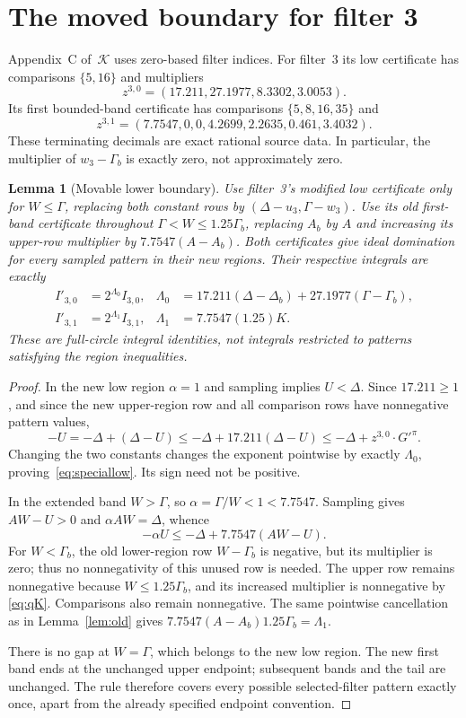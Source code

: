 \documentclass[11pt]{article}
\newtheorem{lemma}[theorem]{Lemma}
\theoremstyle{remark}\newtheorem*{remark}{Scope}
\begin{document}
\section{The moved boundary for filter 3}\label{sec:new}
Appendix~C of~$\mathcal K$ uses zero-based filter indices. For filter~3
its low certificate has comparisons $\{5,16\}$ and multipliers
\[
 z^{3,0}=(17.211,27.1977,8.3302,3.0053).
\]
Its first bounded-band certificate has comparisons $\{5,8,16,35\}$ and
\[
 z^{3,1}=(7.7547,0,0,4.2699,2.2635,0.461,3.4032).
\]
These terminating decimals are exact rational source data. In particular,
the multiplier of $w_3-\Gamma_b$ is exactly zero, not approximately zero.

\begin{lemma}[Movable lower boundary]\label{lem:new}
Use filter~3's modified low certificate only for $W\le\Gamma$,
replacing both constant rows by $(\Delta-u_3,\Gamma-w_3)$.
Use its old first-band certificate throughout
$\Gamma<W\le1.25\Gamma_b$, replacing $A_b$ by $A$ and increasing
its upper-row multiplier by $7.7547(A-A_b)$.
Both certificates give ideal domination for every sampled pattern in
their new regions. Their respective integrals are exactly
\begin{align}
 I'_{3,0}&=2^{\Lambda_0}I_{3,0},&
 \Lambda_0&=17.211(\Delta-\Delta_b)+27.1977(\Gamma-\Gamma_b),\label{eq:speciallow}\\
 I'_{3,1}&=2^{\Lambda_1}I_{3,1},&
 \Lambda_1&=7.7547(1.25)K.\label{eq:specialband}
\end{align}
These are full-circle integral identities, not integrals restricted to
patterns satisfying the region inequalities.
\end{lemma}
\begin{proof}
In the new low region $\alpha=1$ and sampling implies $U<\Delta$.
Since $17.211\ge1$, and since the new upper-region row and all
comparison rows have nonnegative pattern values,
\[
 -U=-\Delta+(\Delta-U)
 \le-\Delta+17.211(\Delta-U)\le-\Delta+z^{3,0}\cdot G'^\pi.
\]
Changing the two constants changes the exponent pointwise by exactly
$\Lambda_0$, proving~\eqref{eq:speciallow}. Its sign need not be positive.

In the extended band $W>\Gamma$, so $\alpha=\Gamma/W<1<7.7547$.
Sampling gives $AW-U>0$ and $\alpha AW=\Delta$, whence
\[
 -\alpha U\le-\Delta+7.7547(AW-U).
\]
For $W<\Gamma_b$, the old lower-region row $W-\Gamma_b$ is negative,
but its multiplier is zero; thus no nonnegativity of this unused row
is needed. The upper row remains nonnegative because
$W\le1.25\Gamma_b$, and its increased multiplier is nonnegative by
\eqref{eq:qK}. Comparisons also remain nonnegative.
The same pointwise cancellation as in Lemma~\ref{lem:old} gives
$7.7547(A-A_b)1.25\Gamma_b=\Lambda_1$.

There is no gap at $W=\Gamma$, which belongs to the new low region.
The new first band ends at the unchanged upper endpoint; subsequent
bands and the tail are unchanged. The rule therefore covers every
possible selected-filter pattern exactly once, apart from the already
specified endpoint convention.
\end{proof}
\end{document}
